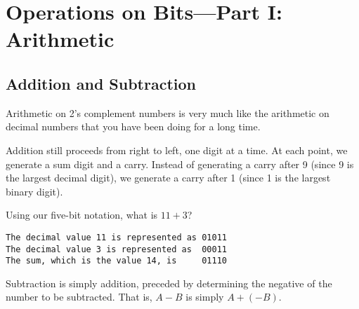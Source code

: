 \documentclass{patt}
\begin{document}
\section{Operations on Bits---Part I: Arithmetic}

\subsection{Addition and Subtraction}

Arithmetic on 2's complement numbers is very much like the arithmetic
on decimal numbers that you have been doing for a long time.

Addition still proceeds from right to left, one digit at a time.  At
each point, we generate a sum digit and a carry.  Instead of
generating a carry after 9 (since 9 is the largest decimal digit), we
generate a carry after 1 (since 1 is the largest binary digit).

\pagebreak

\begin{example}
Using our five-bit notation, what is $11+3$?

\bigskip

\hspace*{-1.5pc}\begin{minipage}{27.5pc}
\color{seventyblack}%
\begin{Verbatim}[fontsize=\fontsize{9}{14}\selectfont]
The decimal value 11 is represented as 01011
The decimal value 3 is represented as  00011
The sum, which is the value 14, is     01110
\end{Verbatim}
\end{minipage}\vspace{-16pt}
\end{example}\vspace{-4pt}

\smallskip

\noindent
Subtraction is simply addition, preceded by determining the negative
of the number to be subtracted. That is, $A-B$ is simply $A+(-B)$.\vspace{-4pt}
\end{document}
